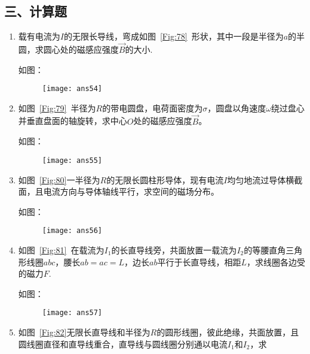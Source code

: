 \subsection*{三、计算题}
\begin{enumerate}
    \item 载有电流为$I$的无限长导线，弯成如图~\ref{Fig:78}~形状，其中一段是半径为$a$的半圆，求圆心处的磁感应强度$\vec{B}$的大小.
    \begin{solution}
        如图：
        \begin{figure}[H]
            \centering
            \texttt{[image: ans54]}
        \end{figure}
    \end{solution}
    \item 如图~\ref{Fig:79}~半径为$R$的带电圆盘，电荷面密度为$\sigma$，圆盘以角速度$\omega$绕过盘心并垂直盘面的轴旋转，求中心$O$处的磁感应强度$\vec{B}$。
    \begin{solution}
        如图：
        \begin{figure}[H]
            \centering
            \texttt{[image: ans55]}
        \end{figure}
    \end{solution}
    \item 如图~\ref{Fig:80}一半径为$R$的无限长圆柱形导体，现有电流$I$均匀地流过导体横截面，且电流方向与导体轴线平行，求空间的磁场分布。
    \begin{solution}
        如图：
        \begin{figure}[H]
            \centering
            \texttt{[image: ans56]}
        \end{figure}
    \end{solution}
    \item 如图~\ref{Fig:81}~在载流为$I_1$的长直导线旁，共面放置一载流为$I_2$的等腰直角三角形线圈$abc$，腰长$ab=ac=L$，边长$ab$平行于长直导线，相距$L$，求线圈各边受的磁力$F$.
    \begin{solution}
        如图：
        \begin{figure}[H]
            \centering
            \texttt{[image: ans57]}
        \end{figure}
    \end{solution}
    \item 如图~\ref{Fig:82}无限长直导线和半径为$R$的圆形线圈，彼此绝缘，共面放置，且圆线圈直径和直导线重合，直导线与圆线圈分别通以电流$I_1$和$I_2$，求

\end{enumerate}
